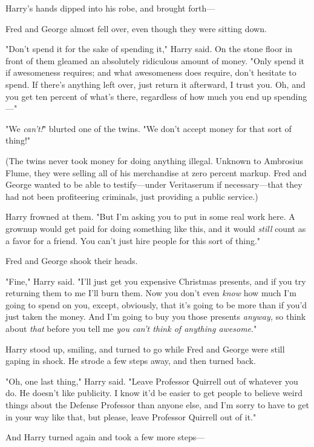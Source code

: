 Harry's hands dipped into his robe, and brought forth---

Fred and George almost fell over, even though they were sitting down.

"Don't spend it for the sake of spending it," Harry said. On the stone floor in 
front of them gleamed an absolutely ridiculous amount of money. "Only spend it 
if awesomeness requires; and what awesomeness does require, don't hesitate to 
spend. If there's anything left over, just return it afterward, I trust you. 
Oh, and you get ten percent of what's there, regardless of how much you end up 
spending---"

"We \emph{can't!}" blurted one of the twins. "We don't accept money for that 
sort of thing!"

(The twins never took money for doing anything illegal. Unknown to Ambrosius 
Flume, they were selling all of his merchandise at zero percent markup. Fred 
and George wanted to be able to testify---under Veritaserum if necessary---that 
they had not been profiteering criminals, just providing a public service.)

Harry frowned at them. "But I'm asking you to put in some real work here. A 
grownup would get paid for doing something like this, and it would \emph{still} 
count as a favor for a friend. You can't just hire people for this sort of 
thing."

Fred and George shook their heads.

"Fine," Harry said. "I'll just get you expensive Christmas presents, and if you 
try returning them to me I'll burn them. Now you don't even \emph{know} how 
much I'm going to spend on you, except, obviously, that it's going to be more 
than if you'd just taken the money. And I'm going to buy you those presents 
\emph{anyway,} so think about \emph{that} before you tell me \emph{you can't 
think of anything awesome}."

Harry stood up, smiling, and turned to go while Fred and George were still 
gaping in shock. He strode a few steps away, and then turned back.

"Oh, one last thing," Harry said. "Leave Professor Quirrell out of whatever you 
do. He doesn't like publicity. I know it'd be easier to get people to believe 
weird things about the Defense Professor than anyone else, and I'm sorry to 
have to get in your way like that, but please, leave Professor Quirrell out of 
it."

And Harry turned again and took a few more steps---

